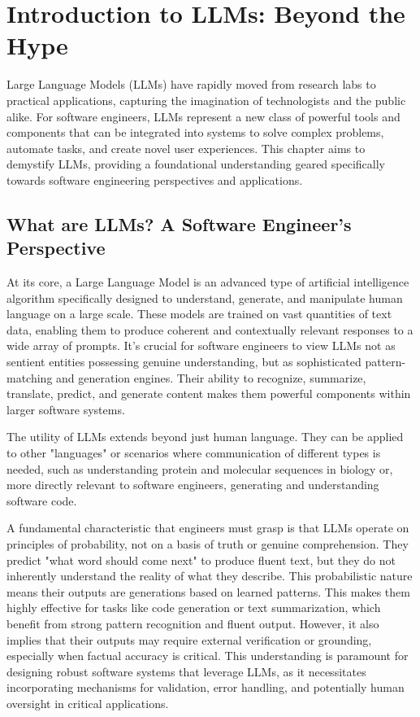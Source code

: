 \chapter{Introduction to LLMs: Beyond the Hype}

Large Language Models (LLMs) have rapidly moved from research labs to practical applications, capturing the imagination of 
technologists and the public alike. For software engineers, LLMs represent a new class of powerful tools and components that can be
 integrated into systems to solve complex problems, automate tasks, and create novel user experiences. This chapter aims to demystify
  LLMs, providing a foundational understanding geared specifically towards software engineering perspectives and applications.

\section{What are LLMs? A Software Engineer's Perspective}

At its core, a Large Language Model is an advanced type of artificial intelligence algorithm specifically designed to understand, 
generate, and manipulate human language on a large scale. These models are trained on vast quantities of text data, enabling them to 
produce coherent and contextually relevant responses to a wide array of prompts. It's crucial for software engineers to view LLMs not 
as sentient entities possessing genuine understanding, but as sophisticated pattern-matching and generation engines. Their ability to 
recognize, summarize, translate, predict, and generate content makes them powerful components within larger software systems.

The utility of LLMs extends beyond just human language. They can be applied to other "languages" or scenarios where communication of 
different types is needed, such as understanding protein and molecular sequences in biology or, more directly relevant to software engineers, 
generating and understanding software code.

A fundamental characteristic that engineers must grasp is that LLMs operate on principles of probability, not on a basis of truth or 
genuine comprehension. They predict "what word should come next" to produce fluent text, but they do not inherently understand the reality 
of what they describe. This probabilistic nature means their outputs are generations based on learned patterns. This makes them highly 
effective for tasks like code generation or text summarization, which benefit from strong pattern recognition and fluent output. However, 
it also implies that their outputs may require external verification or grounding, especially when factual accuracy is critical. 
This understanding is paramount for designing robust software systems that leverage LLMs, as it necessitates incorporating mechanisms 
for validation, error handling, and potentially human oversight in critical applications.

